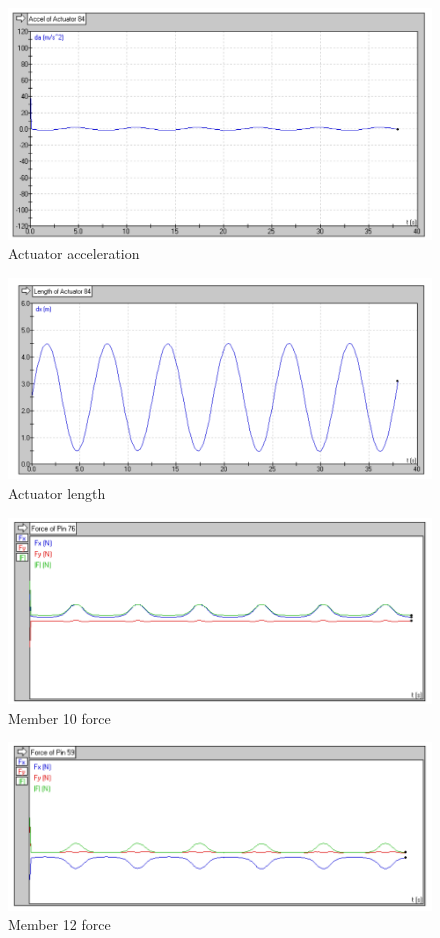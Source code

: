 \documentclass{article}
\begin{document}
\begin{figure}[H]
    \centering
    \includegraphics[width=0.7\linewidth]{Images/ac acc.png}
    \caption{Actuator acceleration}
\end{figure}

\begin{figure}[H]
    \centering
    \includegraphics[width=0.7\linewidth]{Images/ac length.png}
    \caption{Actuator length}
\end{figure}

\begin{figure}[H]
    \centering
    \includegraphics[width=0.7\linewidth]{Images/mem 10.png}
    \caption{Member 10 force}
\end{figure}

\begin{figure}[H]
    \centering
    \includegraphics[width=0.7\linewidth]{Images/mem 12.png}
    \caption{Member 12 force}
\end{figure}
\end{document}
